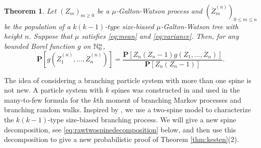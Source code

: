 \documentclass[12pt]{amsart}
\newtheorem{thm}{Theorem}[section]
\numberwithin{equation}{section}
\newcommand{\prob}{\mathbf P}
\newcommand{\expr}[1]{\left( #1 \right)}
\newcommand{\brac}[1]{\left[ #1 \right]}
\begin{document}
\begin{thm}
\label{thm:changeofmeasure}
	Let $(Z_m)_{m\ge 0}$ be a $\mu$-Galton-Watson process and
		$(\ddot Z_m^{(n)})_{0\le m\le n}$
	be the population of a $k(k-1)$-type size-biased $\mu$-Galton-Watson tree with height $n$.
Suppose that $\mu$ satisfies \eqref{eq:mean} and \eqref{eq:variance}.
Then, for any bounded Borel function $g$ on $\mathbb N^{n}_0$,
\begin{equation*}
				 \prob\brac{g\expr{\ddot Z_1^{(n)},\dots,\ddot Z_n^{(n)}}}
	=
				 \frac{\prob\brac{Z_n(Z_n-1) g\expr{Z_1,\dots, Z_n}}}{\prob\brac{Z_n(Z_n-1)}}.			
\end{equation*}
	\end{thm}
\par
	The idea of considering a branching particle system with more than one spine is not new.
	A particle system with $k$ spines  was constructed in \cite{harris2015many} and used in the  many-to-few formula for the $k$th moment of branching Markov processes and branching random walks. Inspired by \cite{harris2015many}, we use a
two-spine model to characterize the $k(k-1)$-type size-biased branching process.
We will give a new spine decomposition, see \eqref{eq:rawtwospinedecomposition}
below, and then use this decomposition to give a new probabilistic proof of
Theorem \ref{thm:kesten}(2).
\end{document}
